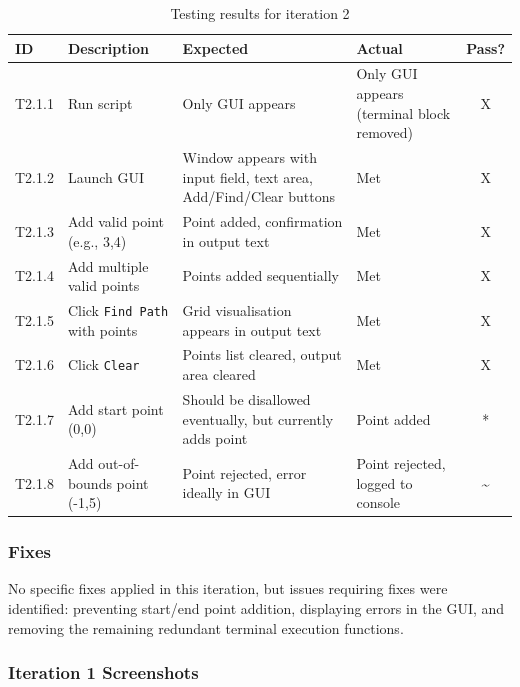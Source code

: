 \begin{table}[htbp]
	\centering
	\begin{tabularx}{\textwidth}{|l|X|p{4.5cm}|p{2.8cm}|c|}
		\hline
		\textbf{ID} & \textbf{Description} & \textbf{Expected} & \textbf{Actual} & \textbf{Pass?} \\
		\hline
		T2.1.1 & Run script & Only GUI appears & Only GUI appears (terminal block removed) & X \\
		\hline
		T2.1.2 & Launch GUI & Window appears with input field, text area, Add/Find/Clear buttons & Met & X \\
		\hline
		T2.1.3 & Add valid point (e.g., 3,4) & Point added, confirmation in output text & Met & X \\
		\hline
		T2.1.4 & Add multiple valid points & Points added sequentially & Met & X \\
		\hline
		T2.1.5 & Click \verb|Find Path| with points & Grid visualisation appears in output text & Met & X \\
		\hline
		T2.1.6 & Click \verb|Clear| & Points list cleared, output area cleared & Met & X \\
		\hline
		T2.1.7 & Add start point (0,0) & Should be disallowed eventually, but currently adds point & Point added & * \\
		\hline
		T2.1.8 & Add out-of-bounds point (-1,5) & Point rejected, error ideally in GUI & Point rejected, logged to console &\~{} \\
		\hline
	\end{tabularx}
	\caption{Testing results for iteration 2}
\end{table}


\subsubsection{Fixes}
No specific fixes applied in this iteration, but issues requiring fixes were identified: preventing start/end point addition, displaying errors in the GUI, and removing the remaining redundant terminal execution functions.

\newpage %

\subsubsection*{Iteration 1 Screenshots}

